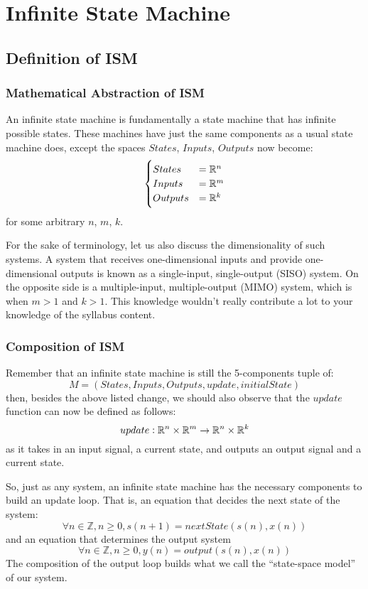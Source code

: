 \chapter{Infinite State Machine}

\section{Definition of ISM}

\subsection{Mathematical Abstraction of ISM}
An infinite state machine is fundamentally a state machine that has infinite possible states.
These machines have just the same components as a usual state machine does, except the spaces $States$, $Inputs$, $Outputs$ now become:
\[
    \begin{cases}
        States &= \mathbb{R}^n \\
        Inputs &= \mathbb{R}^m \\
        Outputs &= \mathbb{R}^k
    \end{cases}
\]
for some arbitrary $n$, $m$, $k$.

For the sake of terminology, let us also discuss the dimensionality of such systems.
A system that receives one-dimensional inputs and provide one-dimensional outputs is known as a single-input, single-output (SISO) system.
On the opposite side is a multiple-input, multiple-output (MIMO) system, which is when $m > 1$ and $k > 1$.
This knowledge wouldn't really contribute a lot to your knowledge of the syllabus content.

\subsection{Composition of ISM}
Remember that an infinite state machine is still the 5-components tuple of:
\[
    M = (States, Inputs, Outputs, update, initialState)
\]
then, besides the above listed change, we should also observe that the $update$ function can now be defined as follows:
\[
    update: \mathbb{R}^n \times \mathbb{R}^m \rightarrow \mathbb{R}^n \times \mathbb{R}^k
\]
as it takes in an input signal, a current state, and outputs an output signal and a current state.

So, just as any system, an infinite state machine has the necessary components to build an update loop. That is, an equation that decides the next state of the system:
\[
    \forall n \in \mathbb{Z}, n \geq 0, s(n+1) = nextState(s(n), x(n))
\]
and an equation that determines the output system
\[
    \forall n \in \mathbb{Z}, n \geq 0, y(n) = output(s(n), x(n))
\]
The composition of the output loop builds what we call the ``state-space model'' of our system.

